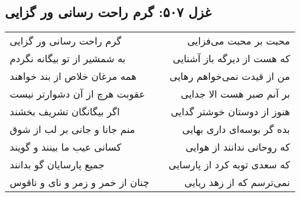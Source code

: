 \begin{center}
\section*{غزل ۵۰۷: گرم راحت رسانی ور گزایی}
\label{sec:507}
\begin{longtable}{l p{0.5cm} r}
گرم راحت رسانی ور گزایی
&&
محبت بر محبت می‌فزایی
\\
به شمشیر از تو بیگانه نگردم
&&
که هست از دیرگه باز آشنایی
\\
همه مرغان خلاص از بند خواهند
&&
من از قیدت نمی‌خواهم رهایی
\\
عقوبت هرچ از آن دشوارتر نیست
&&
بر آنم صبر هست الا جدایی
\\
اگر بیگانگان تشریف بخشند
&&
هنوز از دوستان خوشتر گدایی
\\
منم جانا و جانی بر لب از شوق
&&
بده گر بوسه‌ای داری بهایی
\\
کسانی عیب ما بینند و گویند
&&
که روحانی ندانند از هوایی
\\
جمیع پارسایان گو بدانند
&&
که سعدی توبه کرد از پارسایی
\\
چنان از خمر و زمر و نای و ناقوس
&&
نمی‌ترسم که از زهد ریایی
\\
\end{longtable}
\end{center}
